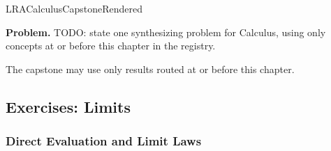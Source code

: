\ifcsname LRACalculusCapstoneRendered\endcsname
\else
\expandafter\gdef\csname LRACalculusCapstoneRendered\endcsname{}

\newpage
{}
\label{cap:calculus}

\begin{tcolorbox}[
  colback=gray!6,
  colframe=gray!40,
  arc=2pt,
  left=8pt, right=8pt, top=6pt, bottom=6pt,
  title={\small\textbf{Capstone Problem}},
  fonttitle=\small\bfseries
]
\textbf{Problem.}
TODO: state one synthesizing problem for Calculus, using only concepts at or
before this chapter in the registry.
\end{tcolorbox}

\begin{remark*}
The capstone may use only results routed at or before this chapter.
\end{remark*}



\subsection*{Exercises: Limits}

\subsubsection*{Direct Evaluation and Limit Laws}

